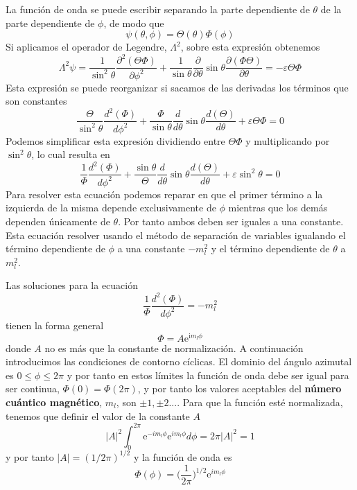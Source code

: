 La función de onda se puede escribir separando la parte
dependiente de $\theta$ de la parte dependiente de $\phi$,
de modo que
\begin{equation}
    \psi(\theta, \phi)=\Theta(\theta)\Phi(\phi)
\end{equation}
Si aplicamos el operador de Legendre, $\Lambda^2$, sobre
esta expresión obtenemos
\begin{equation}
    \Lambda^2\psi=\frac{1}{\sin^2\theta}\frac{\partial^2(\Theta\Phi)}{\partial\phi^2}+
    \frac{1}{\sin\theta}\frac{\partial}{\partial\theta}\sin\theta\frac{\partial(\Phi\Theta)}{\partial\theta}=-\varepsilon\Theta\Phi
\end{equation}
Esta expresión se puede reorganizar si sacamos de las 
derivadas los términos que son constantes 
\begin{equation}
    \frac{\Theta}{\sin^2\theta}\frac{d^2(\Phi)}{d\phi^2} + 
    \frac{\Phi}{\sin\theta}\frac{d}{d\theta}\sin\theta\frac{d(\Theta)}{d\theta}+
    \varepsilon\Theta\Phi=0
\end{equation}
Podemos simplificar esta expresión dividiendo entre $\Theta\Phi$ y 
multiplicando por $\sin^2\theta$, lo cual resulta en
\begin{equation}
    \frac{1}{\Phi}\frac{d^2(\Phi)}{d\phi^2} + 
    \frac{\sin\theta}{\Theta}\frac{d}{d\theta}\sin\theta\frac{d(\Theta)}{d\theta}+
    \varepsilon\sin^2\theta=0\label{eq:rotor}
\end{equation}
Para resolver esta ecuación podemos reparar en que el
primer término a la izquierda de la misma depende 
exclusivamente de $\phi$ mientras que los demás 
dependen únicamente de $\theta$. Por tanto ambos deben
ser iguales a una constante. Esta ecuación resolver
usando el método de separación de variables igualando
el término dependiente de $\phi$ a una constante 
$-m^2_l$ y el término dependiente de $\theta$ a $m^2_l$.

Las soluciones para la ecuación 
\begin{equation}
    \frac{1}{\Phi}\frac{d^2(\Phi)}{d\phi^2}=-m^2_l
\end{equation}
tienen la forma general
\begin{equation}
    \Phi=A\mathrm{e}^{\mathrm{i}m_l\phi}
\end{equation}
donde $A$ no es más que la constante de normalización. A 
continuación introducimos las condiciones de contorno cíclicas.
El dominio del ángulo azimutal es $0\leq \phi\leq2\pi$
y por tanto en estos límites la función de onda debe ser
igual para ser continua, $\Phi(0)=\Phi(2\pi)$, y por tanto
los valores aceptables del \textbf{número cuántico magnético},
$m_l$, son $\pm 1,\pm 2...$. Para que la función esté
normalizada, tenemos que definir el valor de
la constante $A$
\begin{equation}
    |A|^2\int_0^{2\pi}\mathrm{e}^{-im_l\phi}\mathrm{e}^{im_l\phi}d\phi=
    2\pi|A|^2=1
\end{equation}
y por tanto $|A|=(1/2\pi)^{1/2}$ y la función de onda es
\begin{equation}
    \Phi(\phi)=\bigg(\frac{1}{2\pi}\bigg)^{1/2}\mathrm{e}^{im_l\phi}
\end{equation}

